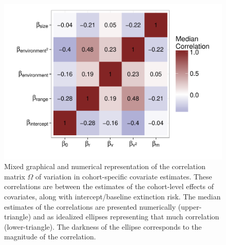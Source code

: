 \documentclass{article}
\begin{document}
\begin{figure}[ht]
  \centering
  \includegraphics[height = 0.8\textheight,width=\textwidth,keepaspectratio=true]{figure/wei_cor_heatmap}
  \caption{Mixed graphical and numerical representation of the correlation matrix \(\Omega\) of variation in cohort-specific covariate estimates. These correlations are between the estimates of the cohort-level effects of covariates, along with intercept/baseline extinction risk. The median estimates of the correlations are presented numerically (upper-triangle) and as idealized ellipses representing that much correlation (lower-triangle). The darkness of the ellipse corresponds to the magnitude of the correlation.}
  \label{fig:cor_posterior}
\end{figure}
\end{document}
